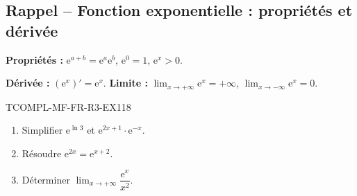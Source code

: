 

\subsection*{Rappel -- Fonction exponentielle : propriétés et dérivée}

\textbf{Propriétés :} $\mathrm{e}^{a+b} = \mathrm{e}^a \mathrm{e}^b$, $\mathrm{e}^0 = 1$, $\mathrm{e}^x > 0$.

\textbf{Dérivée :} $(\mathrm{e}^x)' = \mathrm{e}^x$. \textbf{Limite :} $\lim_{x \to +\infty} \mathrm{e}^x = +\infty$, $\lim_{x \to -\infty} \mathrm{e}^x = 0$.

\begin{exercice}{TCOMPL-MF-FR-R3-EX1}{1}{8}
\begin{enumerate}
  \item Simplifier $\mathrm{e}^{\ln 3}$ et $\mathrm{e}^{2x + 1} \cdot \mathrm{e}^{-x}$.
  \item Résoudre $\mathrm{e}^{2x} = \mathrm{e}^{x+2}$.
  \item Déterminer $\lim_{x \to +\infty} \dfrac{\mathrm{e}^x}{x^2}$.
\end{enumerate}
\end{exercice}

